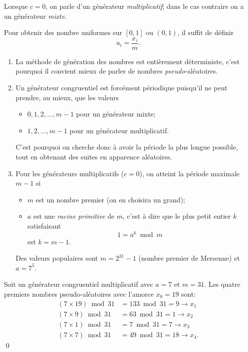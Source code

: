 Lorsque $c = 0$, on parle d'un générateur \emph{multiplicatif}; dans
le cas contraire on a un générateur \emph{mixte}.

Pour obtenir des nombre uniformes sur $[0, 1]$ ou $(0, 1)$, il suffit
de définir
\begin{equation*}
  u_i = \frac{x_i}{m}.
\end{equation*}

\begin{rems}
  \begin{enumerate}
  \item La méthode de génération des nombres est entièrement
    déterministe, c'est pourquoi il convient mieux de parler de
    nombres \emph{pseudo}-aléatoires.
  \item Un générateur congruentiel est forcément périodique puisqu'il
    ne peut prendre, au mieux, que les valeurs
    \begin{itemize}
    \item $0, 1, 2, \dots, m - 1$ pour un générateur mixte;
    \item $1, 2, \dots, m - 1$ pour un générateur multiplicatif.
    \end{itemize}
    C'est pourquoi on cherche donc à avoir la période la plus longue
    possible, tout en obtenant des suites en apparence aléatoires.
  \item Pour les générateurs multiplicatifs ($c = 0$), on atteint la
    période maximale $m - 1$ si
    \begin{itemize}
    \item $m$ est un nombre premier (on en choisira un grand);
    \item $a$ est une \emph{racine primitive} de $m$, c'est à dire que
      le plus petit entier $k$ satisfaisant
      \begin{equation*}
        1 = a^k \bmod m
      \end{equation*}
      est $k = m - 1$.
    \end{itemize}
    Des valeurs populaires sont $m = 2^{31} - 1$ (nombre premier de
    Mersenne) et $a = 7^5$.
  \end{enumerate}
\end{rems}

\begin{exemple}
  Soit un générateur congruentiel multiplicatif avec $a = 7$ et $m =
  31$. Les quatre premiers nombres pseudo-aléatoires avec l'amorce
  $x_0 = 19$ sont:
  \begin{align*}
    (7 \times 19) \bmod 31 &= 133 \bmod 31 = 9 \rightarrow x_1 \\
    (7 \times 9) \bmod 31 &= 63 \bmod 31 = 1 \rightarrow x_2 \\
    (7 \times 1) \bmod 31 &= 7 \bmod 31 = 7 \rightarrow x_3 \\
    (7 \times 7) \bmod 31 &= 49 \bmod 31 = 18 \rightarrow x_4.
  \end{align*}
  \qed
\end{exemple}

